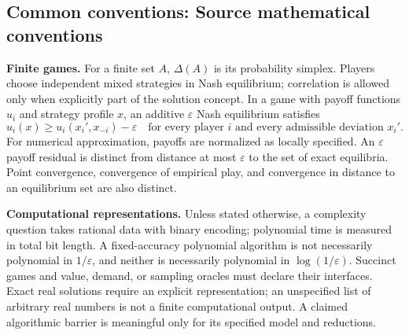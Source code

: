 \documentclass[11pt,a4paper]{article}
\begin{document}
\par\endgroup

\subsection*{Common conventions: Source mathematical conventions}

\textbf{Finite games.} For a finite set $A$, $\Delta(A)$ is its probability
simplex. Players choose independent mixed strategies in Nash equilibrium;
correlation is allowed only when explicitly part of the solution concept.
In a game with payoff functions $u_i$ and strategy profile $x$, an additive
$\varepsilon$ Nash equilibrium satisfies
\[
 u_i(x)\geq u_i(x_i',x_{-i})-\varepsilon
 \quad\text{for every player $i$ and every admissible deviation $x_i'$}.
\]
For numerical approximation, payoffs are normalized as locally specified.
An $\varepsilon$ payoff residual is distinct from distance at most
$\varepsilon$ to the set of exact equilibria. Point convergence, convergence
of empirical play, and convergence in distance to an equilibrium set are
also distinct.

\textbf{Computational representations.} Unless stated otherwise, a complexity
question takes rational data with binary encoding; polynomial time is measured
in total bit length. A fixed-accuracy polynomial algorithm is not necessarily
polynomial in $1/\varepsilon$, and neither is necessarily polynomial in
$\log(1/\varepsilon)$. Succinct games and value, demand, or sampling oracles
must declare their interfaces. Exact real solutions require an explicit
representation; an unspecified list of arbitrary real numbers is not a
finite computational output. A claimed algorithmic barrier is meaningful
only for its specified model and reductions.
\end{document}
